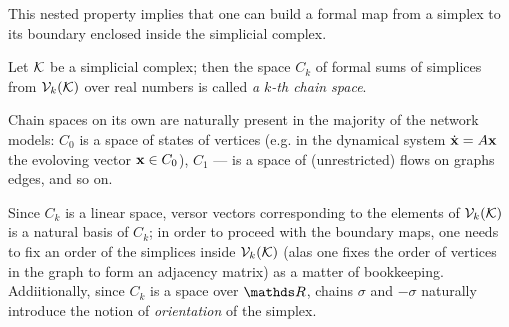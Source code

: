 This nested property implies that one can build a formal map from a simplex to its boundary enclosed inside the simplicial complex. 

\begin{definition}
      Let \( \mathcal{K} \) be a simplicial complex; then the space \( C_k \) of formal sums of simplices from \( \mathcal{V}_{k}(\mathcal{K}) \) over real numbers is called \emph{a \( k\)-th chain space}.
\end{definition}

Chain spaces on its own are naturally present in the majority of the network models: \( C_0 \) is a space of states of vertices (e.g. in the dynamical system \( \dot{ \mathbf{x} } = A \mathbf{x} \) the evoloving vector \( \mathbf{x} \in C_0 \)), \( C_1 \) --- is a space of (unrestricted) flows on graphs edges, and so on.

Since \( C_k \) is a linear space, versor vectors corresponding to the elements of \( \mathcal{V}_{k}(\mathcal{K})\) is a natural basis of \( C_k \); in order to proceed with the boundary maps, one needs to fix an order of the simplices inside \( \mathcal{V}_{k}(\mathcal{K}) \) (alas one fixes the order of vertices in the graph to form an adjacency matrix) as a matter of bookkeeping. Addiitionally, since \( C_k \) is a space over \( \ds R \), chains \( \sigma \) and \( - \sigma \) naturally introduce the notion of \emph{orientation} of the simplex.